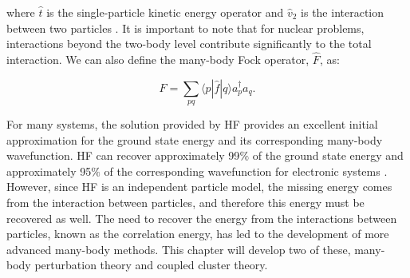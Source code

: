 where $\hat{t}$ is the single-particle kinetic energy operator and $\hat{v}_2$ is the interaction between two particles \cite{Ref4}.  It is important to note that for nuclear problems, interactions beyond the two-body level contribute significantly to the total interaction. We can also define the many-body Fock operator, $\hat{F}$, as:

\begin{equation}
    \hat{F} = \sum_{pq} \langle p | \hat{f} | q \rangle a^\dagger_p a_q.
\end{equation}

For many systems, the solution provided by HF provides an excellent initial approximation for the ground state energy and its corresponding many-body wavefunction. HF can recover approximately 99$\%$ of the ground state energy and approximately 95$\%$ of the corresponding wavefunction for electronic systems \cite{Ref4, Ref21}. However, since HF is an independent particle model, the missing energy comes from the interaction between particles, and therefore this energy must be recovered as well. The need to recover the energy from the interactions between particles, known as the correlation energy, has led to the development of more advanced many-body methods. This chapter will develop two of these, many-body perturbation theory and coupled cluster theory.